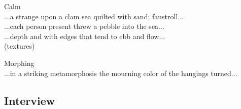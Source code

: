 Calm\\
$\ldots$a strange upon a clam sea quilted with sand; faustroll$\ldots$\\
$\ldots$each person present threw a pebble into the sea$\ldots$\\
$\ldots$depth and with edges that tend to ebb and flow$\ldots$\\
(textures)

Morphing\\
$\ldots$in a striking metamorphosis the mourning color of the hangings turned$\ldots$

\subsection{Interview}
